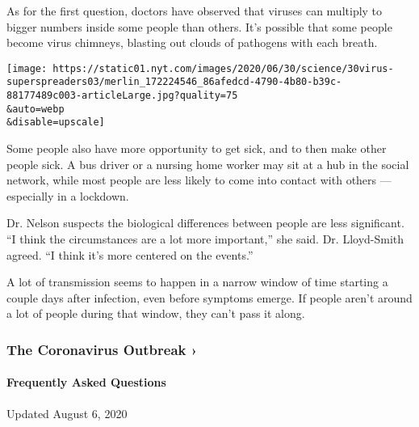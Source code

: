 As for the first question, doctors have observed that viruses can
multiply to bigger numbers inside some people than others. It's possible
that some people become virus chimneys, blasting out clouds of pathogens
with each breath.

\texttt{[image: https://static01.nyt.com/images/2020/06/30/science/30virus-superspreaders03/merlin\_172224546\_86afedcd-4790-4b80-b39c-88177489c003-articleLarge.jpg?quality=75\\\&auto=webp\\\&disable=upscale]}

Some people also have more opportunity to get sick, and to then make
other people sick. A bus driver or a nursing home worker may sit at a
hub in the social network, while most people are less likely to come
into contact with others --- especially in a lockdown.

Dr. Nelson suspects the biological differences between people are less
significant. ``I think the circumstances are a lot more important,'' she
said. Dr. Lloyd-Smith agreed. ``I think it's more centered on the
events.''

A lot of transmission seems to happen in a narrow window of time
starting a couple days after infection, even before symptoms emerge. If
people aren't around a lot of people during that window, they can't pass
it along.

\href{https://www.nytimes.com/news-event/coronavirus?action=click\&pgtype=Article\&state=default\&region=MAIN_CONTENT_3\&context=storylines_faq}{}

\hypertarget{the-coronavirus-outbreak-}{%
\subsubsection{The Coronavirus Outbreak
›}\label{the-coronavirus-outbreak-}}

\hypertarget{frequently-asked-questions}{%
\paragraph{Frequently Asked
Questions}\label{frequently-asked-questions}}

Updated August 6, 2020

